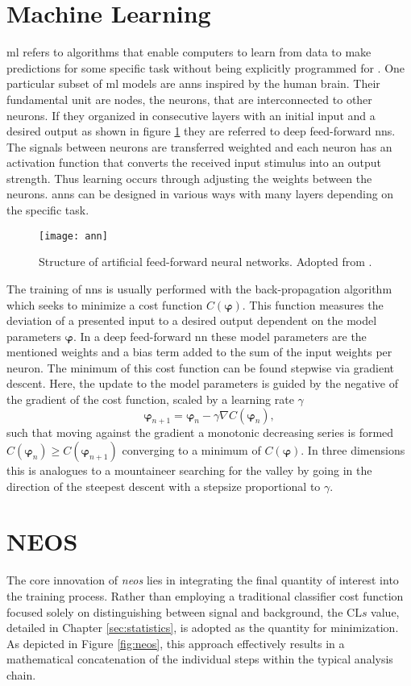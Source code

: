 \section{Machine Learning}
\ac{ml} refers to algorithms that enable computers to learn from data to make predictions for some specific task without being explicitly programmed for \citep{kubat2021introduction}. One particular subset of \ac{ml} models are \acp{ann} inspired by the human brain. Their fundamental unit are nodes, the neurons, that are interconnected to other neurons. If they organized in consecutive layers with an initial input and a desired output as shown in figure \ref{fig:ann} they are referred to deep feed-forward \acp{nn}. The signals between neurons are transferred weighted and each neuron has an activation function that converts the received input stimulus into an output strength. Thus learning occurs through adjusting the weights between the neurons. \acp{ann} can be designed in various ways with many layers depending on the specific task.
\begin{figure}
    \centering
    \texttt{[image: ann]}
    \caption[]{Structure of artificial feed-forward neural networks. Adopted from \citep{8114708}.}
    \label{fig:ann}
\end{figure}

The training of \acp{nn} is usually performed with the back-propagation algorithm which seeks to minimize a cost function $C(\bm{\varphi})$. This function measures the deviation of a presented input to a desired output dependent on the model parameters $\bm{\varphi}$. In a deep feed-forward \ac{nn} these model parameters are the mentioned weights and a bias term added to the sum of the input weights per neuron. The minimum of this cost function can be found stepwise via gradient descent. Here, the update to the model parameters is guided by the negative of the gradient of the cost function, scaled by a learning rate $\gamma$
\begin{equation}
    \bm{\varphi}_{n+1} = \bm{\varphi}_n-\gamma\nabla C(\bm{\varphi}_n),
    \label{eq:grad_descent}
\end{equation}
such that moving against the gradient a monotonic decreasing series is formed $C(\bm{\varphi}_n )\ge C(\bm{\varphi}_{n+1})$ converging to a minimum of $C(\bm{\varphi})$. In three dimensions this is analogues to a mountaineer searching for the valley by going in the direction of the steepest descent with a stepsize proportional to $\gamma$.

\section{NEOS}
The core innovation of \textit{\ac{neos}} lies in integrating the final quantity of interest into the training process. Rather than employing a traditional classifier cost function focused solely on distinguishing between signal and background, the $\mathrm{CL}s$ value, detailed in Chapter \ref{sec:statistics}, is adopted as the quantity for minimization. As depicted in Figure \ref{fig:neos}, this approach effectively results in a mathematical concatenation of the individual steps within the typical analysis chain.

